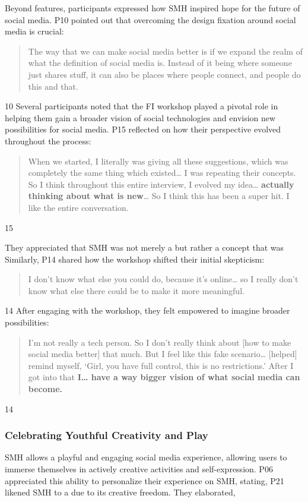 Beyond features, participants expressed how SMH inspired hope for the future of social media. P10 pointed out that overcoming the design fixation around social media is crucial: \blockquote{The way that we can make social media better is if we expand the realm of what the definition of social media is. Instead of it being where someone just shares stuff, it can also be places where people connect, and people do this and that.}{10}
Several participants noted that the FI workshop played a pivotal role in helping them gain a broader vision of social technologies and envision new possibilities for social media. P15 reflected on how their perspective evolved throughout the process:
\blockquote{When we started, I literally was giving all these suggestions, which was completely the same thing which existed\ldots{} I was repeating their concepts. So I think throughout this entire interview, I evolved my idea\ldots{} \textbf{actually thinking about what is new}\ldots{} So I think this has been a super hit. I like the entire conversation.}{15}

They appreciated that SMH was not merely a  but rather a concept that was  Similarly, P14 shared how the workshop shifted their initial skepticism: \blockquote{I don't know what else you could do, because it's online\ldots{} so I really don't know what else there could be to make it more meaningful.}{14} After engaging with the workshop, they felt empowered to imagine broader possibilities: \blockquote{I'm not really a tech person. So I don't really think about [how to make social media better] that much. But I feel like this fake scenario\ldots{} [helped] remind myself, `Girl, you have full control, this is no restrictions.' After I got into that \textbf{I\ldots{} have a way bigger vision of what social media can become.}}{14}

 
\subsubsection{Celebrating Youthful Creativity and Play}
\label{lab:4-6-2}
SMH allows a playful and engaging social media experience, allowing users to immerse themselves in actively creative activities and self-expression. P06 appreciated this ability to personalize their experience on SMH, stating,  P21 likened SMH to a  due to its creative freedom. They elaborated, 

